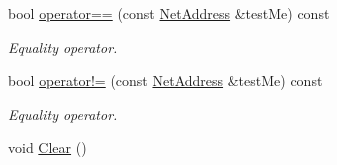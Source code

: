 \begin{DoxyCompactItemize}
bool \hyperlink{class_net_address_a70e4f3cdeb959cad309e60f83d467fe3}{operator==} (const \hyperlink{class_net_address}{NetAddress} \&testMe) const 
\begin{DoxyCompactList}\small\item\em Equality operator. \item\end{DoxyCompactList}\item 
bool \hyperlink{class_net_address_a766b1d3613f0313361195496e7ddcc3d}{operator!=} (const \hyperlink{class_net_address}{NetAddress} \&testMe) const 
\begin{DoxyCompactList}\small\item\em Equality operator. \item\end{DoxyCompactList}\item 
\hypertarget{class_net_address_aa40e06b0ef2fdf05016f62857121c3b8}{
void \hyperlink{class_net_address_aa40e06b0ef2fdf05016f62857121c3b8}{Clear} ()}
\label{class_net_address_aa40e06b0ef2fdf05016f62857121c3b8}


\end{DoxyCompactItemize}
